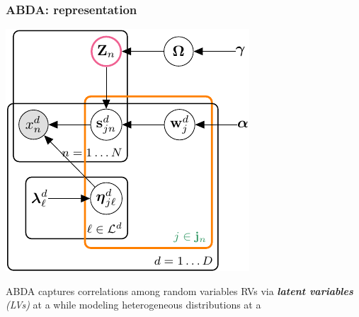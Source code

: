 \documentclass[xcolor={usenames,dvipsnames,svgnames}, compress, aspectratio=169, 11pt]{beamer}
\begin{document}
\begin{frame}[t, htt=bgrey2]
  \frametitle{ABDA: representation}

  \large
  \begin{minipage}[t]{0.3\linewidth}
    \includegraphics[width=.99\linewidth]{figures/joint-param-hspn-crop}
  \end{minipage}\hfill\begin{minipage}[t]{0.4\linewidth}
    \vspace{-150pt}
      ABDA captures  correlations among random variables RVs via
  \emph{\textbf{latent variables} (LVs)} at
  a  
  while modeling heterogeneous distributions at a
  
  \end{minipage}  
\end{frame}
\end{document}
